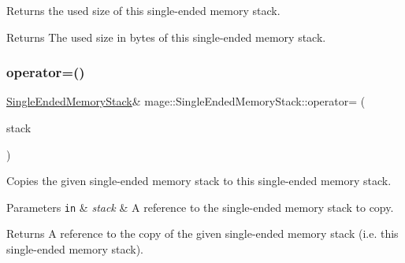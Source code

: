Returns the used size of this single-\/ended memory stack.

\begin{DoxyReturn}{Returns}
The used size in bytes of this single-\/ended memory stack. 
\end{DoxyReturn}
\mbox{\label{classmage_1_1_single_ended_memory_stack_a709db7d21cd2db6e98acd7985770468e}} 
\subsubsection{\texorpdfstring{operator=()}{operator=()}\hspace{0.1cm}{\footnotesize\ttfamily [1/2]}}
{\footnotesize\ttfamily \mbox{\hyperlink{classmage_1_1_single_ended_memory_stack}{Single\+Ended\+Memory\+Stack}}\& mage\+::\+Single\+Ended\+Memory\+Stack\+::operator= (\begin{DoxyParamCaption}\item[{const \mbox{\hyperlink{classmage_1_1_single_ended_memory_stack}{Single\+Ended\+Memory\+Stack}} \&}]{stack }\end{DoxyParamCaption})\hspace{0.3cm}{\ttfamily [delete]}}

Copies the given single-\/ended memory stack to this single-\/ended memory stack.


\begin{DoxyParams}[1]{Parameters}
\mbox{\tt in}  & {\em stack} & A reference to the single-\/ended memory stack to copy. \\
\hline
\end{DoxyParams}
\begin{DoxyReturn}{Returns}
A reference to the copy of the given single-\/ended memory stack (i.\+e. this single-\/ended memory stack). 
\end{DoxyReturn}
\mbox{\label{classmage_1_1_single_ended_memory_stack_a24613dc91ab6577aa57fbd55a4c81023}} 
